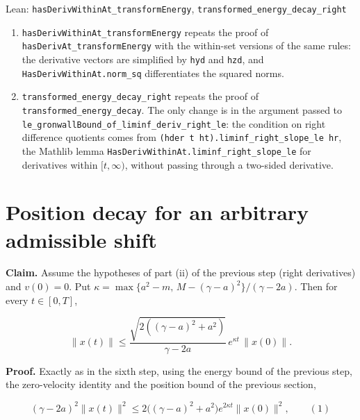 \documentclass[11pt,a4paper]{article}
\begin{document}
\begin{leanbox}{Lean: \texttt{hasDerivWithinAt\_\allowbreak{}transformEnergy}, \texttt{transformed\_\allowbreak{}energy\_\allowbreak{}decay\_\allowbreak{}right}}
\begin{enumerate}


\item \texttt{has\allowbreak{}Deriv\allowbreak{}Within\allowbreak{}At\_\allowbreak{}transform\allowbreak{}Energy} repeats the proof of \texttt{has\allowbreak{}Deriv\allowbreak{}At\_\allowbreak{}transform\allowbreak{}Energy} with the within-set versions of the same rules: the derivative vectors are simplified by \texttt{hyd} and \texttt{hzd}, and \texttt{Has\allowbreak{}Deriv\allowbreak{}Within\allowbreak{}At.\allowbreak{}norm\_\allowbreak{}sq} differentiates the squared norms.

\item \texttt{transformed\_\allowbreak{}energy\_\allowbreak{}decay\_\allowbreak{}right} repeats the proof of \texttt{transformed\_\allowbreak{}energy\_\allowbreak{}decay}. The only change is in the argument passed to \texttt{le\_\allowbreak{}gronwall\allowbreak{}Bound\_\allowbreak{}of\_\allowbreak{}liminf\_\allowbreak{}deriv\_\allowbreak{}right\_\allowbreak{}le}: the condition on right difference quotients comes from \texttt{(hder t ht).\allowbreak{}liminf\_\allowbreak{}right\_\allowbreak{}slope\_\allowbreak{}le hr}, the Mathlib lemma \texttt{Has\allowbreak{}Deriv\allowbreak{}Within\allowbreak{}At.\allowbreak{}liminf\_\allowbreak{}right\_\allowbreak{}slope\_\allowbreak{}le} for derivatives within \([t,\infty)\), without passing through a two-sided derivative.

\end{enumerate}
\end{leanbox}

\section{\texorpdfstring{Position decay for an arbitrary admissible shift}{Position decay for an arbitrary admissible shift}}


\textbf{Claim.} Assume the hypotheses of part (ii) of the previous step (right derivatives) and \(v(0)=0\). Put \(\kappa=\max\{a^2-m,\,M-(\gamma-a)^2\}/(\gamma-2a)\). Then for every \(t\in[0,T]\),


\[\|x(t)\|\le\frac{\sqrt{2((\gamma-a)^2+a^2)}}{\gamma-2a}\,e^{\kappa t}\,\|x(0)\|.\]


\textbf{Proof.} Exactly as in the sixth step, using the energy bound of the previous step, the zero-velocity identity and the position bound of the previous section,


\[(\gamma-2a)^2\|x(t)\|^2\le2\bigl((\gamma-a)^2+a^2\bigr)e^{2\kappa t}\|x(0)\|^2,\qquad(1)\]
\end{document}
